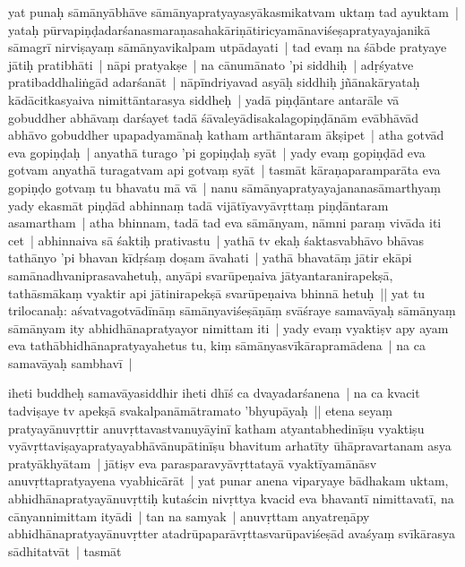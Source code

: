 \documentclass[article,12pt,a4paper]{memoir}%
\newcommand{\persName}[1]{#1}
\newcounter{parCount}
\begin{document}
	  
	  \pstart \leavevmode%
	\label{thakur75-63.21}yat punaḥ sāmānyābhāve sāmānyapratyayasyākasmikatvam uktaṃ tad ayuktam | yataḥ pūrvapiṇḍadarśanasmaraṇasahakāriṇātiricyamānaviśeṣapratyayajanikā sāmagrī nirviṣayaṃ sāmānyavikalpam utpādayati | tad evaṃ na śābde pratyaye jātiḥ pratibhāti | nāpi pratyakṣe | na cānumānato 'pi siddhiḥ | adṛśyatve pratibaddhaliṅgād adarśanāt | nāpīndriyavad asyāḥ siddhiḥ jñānakāryataḥ kādācitkasyaiva nimittāntarasya siddheḥ | yadā piṇḍāntare antarāle vā gobuddher abhāvaṃ darśayet tadā śāvaleyādisakalagopiṇḍānām evābhāvād abhāvo gobuddher upapadyamānaḥ katham arthāntaram ākṣipet | atha gotvād eva gopiṇḍaḥ | anyathā turago 'pi gopiṇḍaḥ syāt | yady evaṃ gopiṇḍād eva gotvam anyathā turagatvam api gotvaṃ syāt | tasmāt kāraṇaparamparāta eva gopiṇḍo gotvaṃ tu bhavatu mā vā | nanu sāmānyapratyayajananasāmarthyaṃ yady ekasmāt piṇḍād abhinnaṃ tadā vijātīyavyāvṛttaṃ piṇḍāntaram asamartham | atha bhinnam, tadā tad eva sāmānyam, nāmni paraṃ vivāda iti cet | abhinnaiva sā śaktiḥ prativastu | yathā tv ekaḥ śaktasvabhāvo bhāvas tathānyo 'pi bhavan kīdṛśaṃ doṣam āvahati | yathā bhavatāṃ jātir ekāpi samānadhvaniprasavahetuḥ, anyāpi svarūpeṇaiva jātyantaranirapekṣā, tathāsmākaṃ vyaktir api jātinirapekṣā svarūpeṇaiva bhinnā hetuḥ || \label{thakur75-64.7} yat tu \persName{trilocanaḥ}: aśvatvagotvādīnāṃ sāmānyaviśeṣāṇāṃ svāśraye samavāyaḥ sāmānyaṃ sāmānyam ity abhidhānapratyayor nimittam iti | yady evaṃ vyaktiṣv apy ayam eva tathābhidhānapratyayahetus tu, kiṃ sāmānyasvīkārapramādena | na ca samavāyaḥ sambhavī |
	{}
	\pend%
      

	  
	  \pstart \leavevmode%
	iheti buddheḥ samavāyasiddhir iheti dhīś ca dvayadarśanena | na ca kvacit tadviṣaye tv apekṣā svakalpanāmātramato 'bhyupāyaḥ || \label{thakur75-64.15} etena seyaṃ pratyayānuvṛttir anuvṛttavastvanuyāyinī katham atyantabhedinīṣu vyaktiṣu vyāvṛttaviṣayapratyayabhāvānupātinīṣu bhavitum arhatīty ūhāpravartanam asya pratyākhyātam | jātiṣv eva parasparavyāvṛttatayā vyaktīyamānāsv anuvṛttapratyayena vyabhicārāt | \label{thakur75-64.19} yat punar anena viparyaye bādhakam uktam, abhidhānapratyayānuvṛttiḥ kutaścin nivṛttya kvacid eva bhavantī nimittavatī, na cānyannimittam ityādi | tan na samyak | anuvṛttam anyatreṇāpy abhidhānapratyayānuvṛtter atadrūpaparāvṛttasvarūpaviśeṣād avaśyaṃ svīkārasya sādhitatvāt | tasmāt
	{}
	\pend%
      
\end{document}
